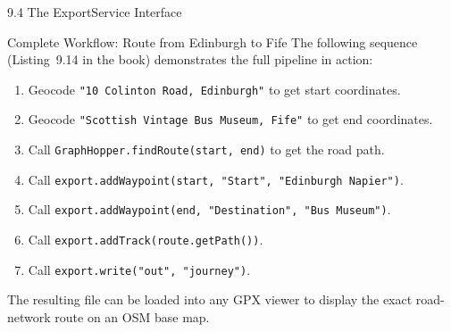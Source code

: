 \documentclass[aspectratio=169,10pt]{beamer}
\begin{document}
\begin{frame}[allowframebreaks]{9.4 The ExportService Interface}
  \begin{exampleblock}{Complete Workflow: Route from Edinburgh to Fife}
    The following sequence (Listing~9.14 in the book) demonstrates
    the full pipeline in action:
    \begin{enumerate}
      \item Geocode \texttt{"10 Colinton Road, Edinburgh"} to get start
            coordinates.
      \item Geocode \texttt{"Scottish Vintage Bus Museum, Fife"} to get
            end coordinates.
      \item Call \texttt{GraphHopper.findRoute(start, end)} to get the road
            path.
      \item Call \texttt{export.addWaypoint(start, "Start", "Edinburgh Napier")}.
      \item Call \texttt{export.addWaypoint(end, "Destination", "Bus Museum")}.
      \item Call \texttt{export.addTrack(route.getPath())}.
      \item Call \texttt{export.write("out", "journey")}.
    \end{enumerate}
    The resulting file can be loaded into any GPX viewer to display the
    exact road-network route on an OSM base map.
  \end{exampleblock}

\end{frame}
\end{document}
